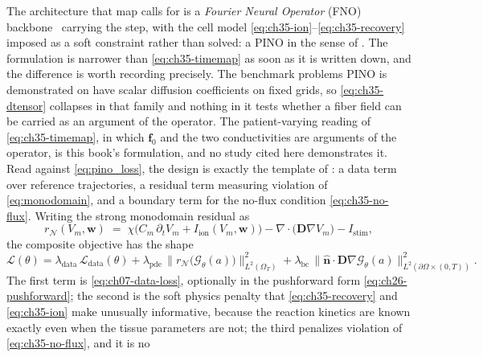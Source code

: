 The
architecture that map calls for is a \emph{Fourier Neural
Operator} (FNO) backbone~\cite{li2021fourier} carrying the step, with the cell
model \eqref{eq:ch35-ion}--\eqref{eq:ch35-recovery} imposed as a soft
constraint rather than solved: a PINO in the sense of \cite{li2021physics}. The
formulation is narrower than \eqref{eq:ch35-timemap} as soon as it is written
down, and the difference is worth recording precisely. The benchmark problems
PINO is demonstrated on \cite{li2021physics} have scalar diffusion coefficients
on fixed grids, so \eqref{eq:ch35-dtensor} collapses in that family and nothing
in it tests whether a fiber field can be carried as an argument of the operator.
The patient-varying reading of \eqref{eq:ch35-timemap}, in which $\mathbf{f}_0$
and the two conductivities are arguments of the operator, is this book's
formulation, and no study cited here demonstrates
it.
Read against
\eqref{eq:pino_loss}, the design is exactly the template of
: a data term over
reference trajectories, a residual term measuring violation of
\eqref{eq:monodomain}, and a boundary term for the no-flux condition
\eqref{eq:ch35-no-flux}. Writing
the strong monodomain residual as
\begin{equation}
  \label{eq:ch35-residual}
  r_{\mathcal{N}}(V_m,\mathbf{w})
  \;=\; \chi\Big(C_m\,\partial_t V_m + I_{\text{ion}}(V_m,\mathbf{w})\Big)
  - \nabla\cdot\!\big(\mathbf{D}\nabla V_m\big) - I_{\text{stim}},
\end{equation}
the composite objective has the shape
\begin{equation}
  \label{eq:ch35-loss}
  \mathcal{L}(\theta)
  = \lambda_{\text{data}}\,\mathcal{L}_{\text{data}}(\theta)
  + \lambda_{\text{pde}}\,\big\|r_{\mathcal{N}}\big(\mathcal{G}_\theta(a)\big)\big\|_{L^2(\Omega_T)}^2
  + \lambda_{\text{bc}}\,\big\|\hat{\mathbf{n}}\cdot\mathbf{D}\nabla \mathcal{G}_\theta(a)\big\|_{L^2(\partial\Omega\times(0,T))}^2 .
\end{equation}
The first term is \eqref{eq:ch07-data-loss}, optionally in the pushforward form
\eqref{eq:ch26-pushforward}; the second is the soft physics penalty that
\eqref{eq:ch35-recovery} and \eqref{eq:ch35-ion} make unusually informative,
because the reaction kinetics are known exactly even when the tissue parameters
are not; the third penalizes violation of \eqref{eq:ch35-no-flux}, and it is no
